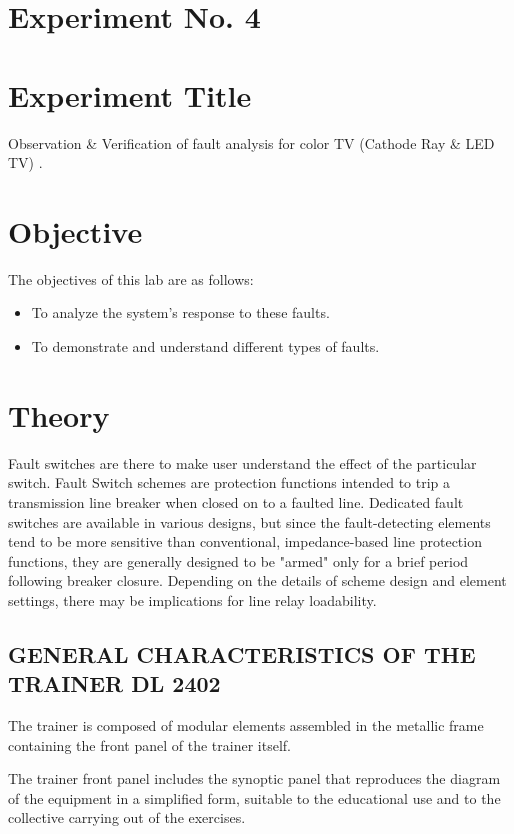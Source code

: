 \documentclass[a4paper,12pt]{article}
\begin{document}
	\section{Experiment No. 4}
	
	\section{Experiment Title }
	Observation \& Verification of fault analysis for color TV (Cathode Ray \& LED TV) .
	\section{Objective}
	
	
	
	The objectives of this lab are as follows:
	\begin{itemize}
		\item To analyze the system's response to these faults.
		\item To demonstrate and understand different types of faults.
	
	\end{itemize}
	
	\section{Theory}
	
	
	
	Fault switches are there to make user understand the effect of the particular switch. Fault Switch schemes are protection functions intended to trip a transmission line breaker when closed on to a faulted line. Dedicated fault switches are available in various designs, but since the fault-detecting elements tend to be more sensitive than conventional, impedance-based line protection functions, they are generally designed to be "armed" only for a brief period following breaker closure. Depending on the details of scheme design and element settings, there may be implications for line relay loadability.
	\subsection{GENERAL CHARACTERISTICS OF THE TRAINER DL 2402}
	
	
	The trainer is composed of modular elements assembled in the metallic frame containing the front panel of the trainer itself.
	
	The trainer front panel includes the synoptic panel that reproduces the diagram of the equipment in a simplified form, suitable to the educational use and to the collective carrying out of the exercises.
	
\end{document}
